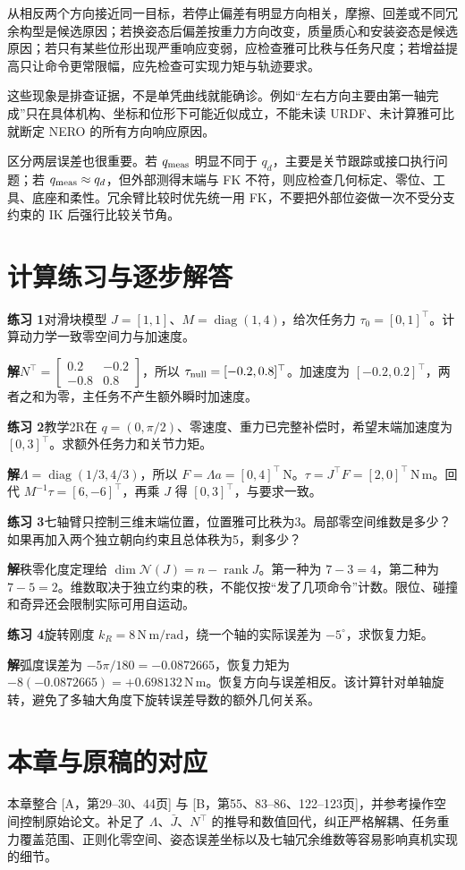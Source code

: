 从相反两个方向接近同一目标，若停止偏差有明显方向相关，摩擦、回差或不同冗余构型是候选原因；若换姿态后偏差按重力方向改变，质量质心和安装姿态是候选原因；若只有某些位形出现严重响应变弱，应检查雅可比秩与任务尺度；若增益提高只让命令更常限幅，应先检查可实现力矩与轨迹要求。

这些现象是排查证据，不是单凭曲线就能确诊。例如“左右方向主要由第一轴完成”只在具体机构、坐标和位形下可能近似成立，不能未读 URDF、未计算雅可比就断定 NERO 的所有方向响应原因。

区分两层误差也很重要。若 $q_{\rm meas}$ 明显不同于 $q_d$，主要是关节跟踪或接口执行问题；若 $q_{\rm meas}\approx q_d$，但外部测得末端与 FK 不符，则应检查几何标定、零位、工具、底座和柔性。冗余臂比较时优先统一用 FK，不要把外部位姿做一次不受分支约束的 IK 后强行比较关节角。

\section{计算练习与逐步解答}

\textbf{练习 1}\quad 对滑块模型 $J=[1,1]$、$M=\operatorname{diag}(1,4)$，给次任务力 $\tau_0=[0,1]^\top$。计算动力学一致零空间力与加速度。

\textbf{解}\quad $N^\top=\left[\begin{smallmatrix}0.2&-0.2\\-0.8&0.8\end{smallmatrix}\right]$，所以 $\tau_{\rm null}=[-0.2,0.8]^\top$。加速度为 $[-0.2,0.2]^\top$，两者之和为零，主任务不产生额外瞬时加速度。

\textbf{练习 2}\quad 教学2R在 $q=(0,\pi/2)$、零速度、重力已完整补偿时，希望末端加速度为 $[0,3]^\top$。求额外任务力和关节力矩。

\textbf{解}\quad $\Lambda=\operatorname{diag}(1/3,4/3)$，所以 $F=\Lambda a=[0,4]^\top\,\mathrm{N}$。$\tau=J^\top F=[2,0]^\top\,\mathrm{N\,m}$。回代 $M^{-1}\tau=[6,-6]^\top$，再乘 $J$ 得 $[0,3]^\top$，与要求一致。

\textbf{练习 3}\quad 七轴臂只控制三维末端位置，位置雅可比秩为3。局部零空间维数是多少？如果再加入两个独立朝向约束且总体秩为5，剩多少？

\textbf{解}\quad 秩零化度定理给 $\dim\mathcal N(J)=n-\operatorname{rank}J$。第一种为 $7-3=4$，第二种为 $7-5=2$。维数取决于独立约束的秩，不能仅按“发了几项命令”计数。限位、碰撞和奇异还会限制实际可用自运动。

\textbf{练习 4}\quad 旋转刚度 $k_R=8\,\mathrm{N\,m/rad}$，绕一个轴的实际误差为 $-5^\circ$，求恢复力矩。

\textbf{解}\quad 弧度误差为 $-5\pi/180=-0.0872665$，恢复力矩为 $-8(-0.0872665)=+0.698132\,\mathrm{N\,m}$。恢复方向与误差相反。该计算针对单轴旋转，避免了多轴大角度下旋转误差导数的额外几何关系。

\section*{本章与原稿的对应}
本章整合 [A，第29--30、44页] 与 [B，第55、83--86、122--123页]，并参考操作空间控制原始论文\cite{khatib}。补足了 $\Lambda$、$\bar J$、$N^\top$ 的推导和数值回代，纠正严格解耦、任务重力覆盖范围、正则化零空间、姿态误差坐标以及七轴冗余维数等容易影响真机实现的细节。
